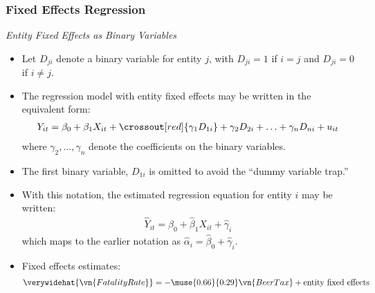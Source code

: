 \begin{frame}
\frametitle{Fixed Effects Regression}
\emph{Entity Fixed Effects as Binary Variables}
\begin{itemize}
\item Let $D_{ji}$ denote a binary variable for entity $j$, with $D_{ji}=1$ if $i=j$ and $D_{ji}=0$ if $i\ne j$. 
\item The regression model with entity fixed effects may be written in the equivalent form:
\begin{align*}
Y_{it} = \beta_{0} + \beta_{1} X_{it} 
       + \crossout[red]{\gamma_{1}D_{1i}} + \gamma_{2}D_{2i} + \ldots + \gamma_{n}D_{ni} + u_{it}
\end{align*}
where $\gamma_{2},\ldots,\gamma_{n}$ denote the coefficients on the binary variables.
\item The first binary variable, $D_{1i}$ is omitted to avoid the ``dummy variable trap.''
\item With this notation, the estimated regression equation for entity $i$ may be written:
\begin{align*}
\hat{Y}_{it} = \hat{\beta}_{0} + \hat{\beta}_{1} X_{it} + \hat{\gamma}_{i}
\end{align*}
which maps to the earlier notation as $\hat{\alpha}_{i}=\hat{\beta}_{0}+\hat{\gamma}_{i}$.
\item Fixed effects estimates:
\begin{align*}
\verywidehat{\vn{FatalityRate}}
  = -\muse{0.66}{0.29} \vn{BeerTax} + \text{entity fixed effects}
\end{align*}
\end{itemize}
\end{frame}

